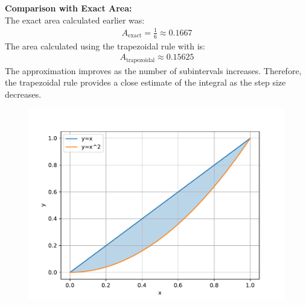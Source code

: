 \documentclass[journal]{IEEEtran}
\begin{document}
\textbf{Comparison with Exact Area:}\\
The exact area calculated earlier was:
\begin{align}
    A_{\text{exact}} = \frac{1}{6} \approx 0.1667
\end{align}
The area calculated using the trapezoidal rule with  is:
\begin{align}
    A_{\text{trapezoidal}} \approx 0.15625
\end{align}
The approximation improves as the number of subintervals increases. Therefore, the trapezoidal rule provides a close estimate of the integral as the step size decreases.
\begin{figure}[h!]
   \centering
   \includegraphics[width=\columnwidth]{figs/fig.pdf}
\end{figure}
\end{document}
